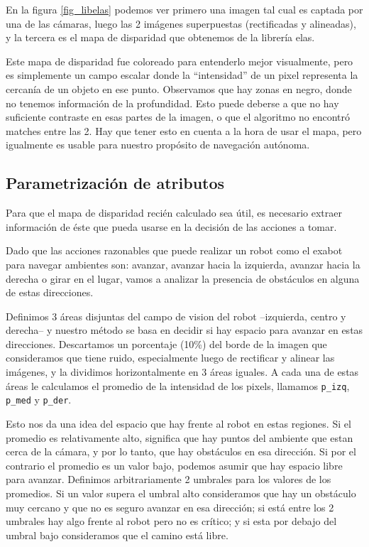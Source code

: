 \documentclass[journal,a4paper]{IEEEtran}
\begin{document}
En la figura \ref{fig_libelas} podemos ver primero una imagen tal cual es captada por una de las cámaras, luego las 2 imágenes superpuestas (rectificadas y alineadas), y la tercera es el mapa de disparidad que obtenemos de la librería elas.

Este mapa de disparidad fue coloreado para entenderlo mejor visualmente, pero es simplemente un campo escalar donde la ``intensidad'' de un pixel representa la cercanía de un objeto en ese punto.
Observamos que hay zonas en negro, donde no tenemos información de la profundidad. Esto puede deberse a que no hay suficiente contraste en esas partes de la imagen, o que el algoritmo no encontró matches entre las 2. Hay que tener esto en cuenta a la hora de usar el mapa, pero igualmente es usable para nuestro propósito de navegación autónoma.

\subsection{Parametrización de atributos}
Para que el mapa de disparidad recién calculado sea útil, es necesario extraer información de éste que pueda usarse en la decisión de las acciones a tomar.

Dado que las acciones razonables que puede realizar un robot como el exabot para navegar ambientes son: avanzar, avanzar hacia la izquierda, avanzar hacia la derecha o girar en el lugar, vamos a analizar la presencia de obstáculos en alguna de estas direcciones.

Definimos 3 áreas disjuntas del campo de vision del robot --izquierda, centro y derecha-- y nuestro método se basa en decidir si hay espacio para avanzar en estas direcciones.
Descartamos un porcentaje (10\%) del borde de la imagen que consideramos que tiene ruido, especialmente luego de rectificar y alinear las imágenes, y la dividimos horizontalmente en 3 áreas iguales.
A cada una de estas áreas le calculamos el promedio de la intensidad de los pixels, llamamos \texttt{p\_izq}, \texttt{p\_med} y \texttt{p\_der}.

Esto nos da una idea del espacio que hay frente al robot en estas regiones.
Si el promedio es relativamente alto, significa que hay puntos del ambiente que estan cerca de la cámara, y por lo tanto, que hay obstáculos en esa dirección.
Si por el contrario el promedio es un valor bajo, podemos asumir que hay espacio libre para avanzar.
Definimos arbitrariamente 2 umbrales para los valores de los promedios. Si un valor supera el umbral alto consideramos que hay un obstáculo muy cercano y que no es seguro avanzar en esa dirección; si está entre los 2 umbrales hay algo frente al robot pero no es crítico; y si esta por debajo del umbral bajo consideramos que el camino está libre.
\end{document}
